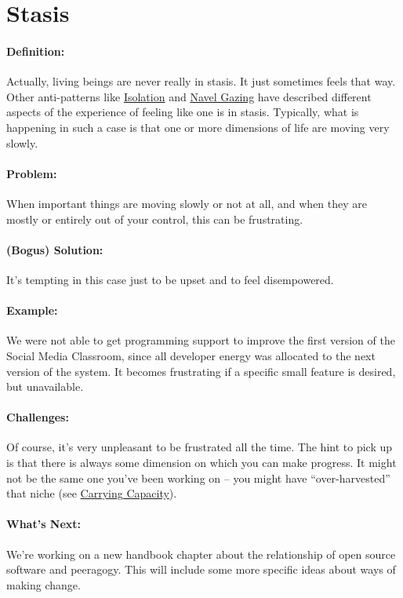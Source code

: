 \section{Stasis}
\paragraph{Definition:} Actually, living beings are never really in stasis.
It just sometimes feels that way. Other anti-patterns like
\href{http://peeragogy.org/antipatterns/isolation/}{Isolation} and
\href{http://peeragogy.org/antipatterns/navel-gazing/}{Navel Gazing}
have described different aspects of the experience of feeling like one
is in stasis. Typically, what is happening in such a case is that one or
more dimensions of life are moving very slowly.

\paragraph{Problem:} When important things are moving slowly or not at all,
and when they are mostly or entirely out of your control, this can be
frustrating.

\paragraph{(Bogus) Solution:} It's tempting in this case just to be upset and to
feel disempowered.

\paragraph{Example:} We were not able to get programming support to improve
the first version of the Social Media Classroom, since all developer
energy was allocated to the next version of the system. It becomes
frustrating if a specific small feature is desired, but unavailable.

\paragraph{Challenges:} Of course, it's very unpleasant to be frustrated
all the time. The hint to pick up is that there is always some dimension
on which you can make progress. It might not be the same one you've been
working on -- you might have ``over-harvested'' that niche (see
\href{http://peeragogy.org/patterns-usecases/patterns-and-heuristics/carrying-capacity/}{Carrying
Capacity}).

\paragraph{What's Next:} We're working on a new handbook chapter about the
relationship of open source software and peeragogy. This will include
some more specific ideas about ways of making change.
